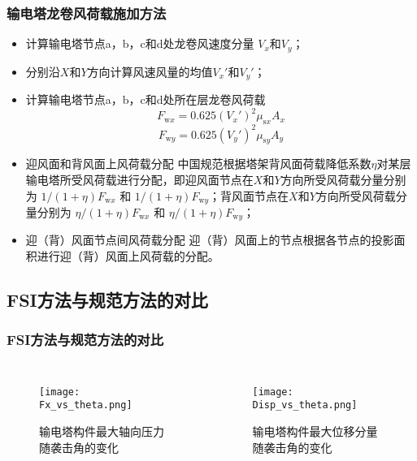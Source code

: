 \begin{frame}
  \frametitle{输电塔龙卷风荷载施加方法}
  \begin{itemize}
  \item 计算输电塔节点a，b，c和d处龙卷风速度分量 $V_x$和$V_y$；
  \item 分别沿$X$和$Y$方向计算风速风量的均值$V_x'$和$V_y'$；
  \item 计算输电塔节点a，b，c和d处所在层龙卷风荷载
    \begin{equation}
      F_{\mathrm{w}x} = 0.625 (V_{x}')^2 \mu_{\mathrm{s}x} A_x 
    \end{equation}
    \begin{equation}
      F_{\mathrm{w}y} = 0.625 (V_{y}')^2 \mu_{\mathrm{s}y} A_y 
    \end{equation}
  \item 迎风面和背风面上风荷载分配
     中国规范根据塔架背风面荷载降低系数$\eta$对某层输电塔所受风荷载进行分配，即迎风面节点在$X$和$Y$方向所受风荷载分量分别为 $1/(1+\eta) F_{\mathrm{w}x}$ 和 $1/(1+\eta) F_{\mathrm{w}y}$；背风面节点在$X$和$Y$方向所受风荷载分量分别为 $\eta/(1+\eta) F_{\mathrm{w}x}$ 和 $\eta/(1+\eta) F_{\mathrm{w}y}$；
   \item 迎（背）风面节点间风荷载分配
     迎（背）风面上的节点根据各节点的投影面积进行迎（背）风面上风荷载的分配。
   \end{itemize}
\end{frame}

\subsection{FSI方法与规范方法的对比}

\begin{frame}
  \frametitle{FSI方法与规范方法的对比}
  
  \begin{columns}
    \begin{figure}[!htbp]
      \centering
      \texttt{[image: Fx\_vs\_theta.png]}
      \caption*{输电塔构件最大轴向压力随袭击角的变化}
      \label{fig:fx-vs-theta}
    \end{figure}

    \begin{figure}[!htbp]
      \centering
      \texttt{[image: Disp\_vs\_theta.png]}
      \caption*{输电塔构件最大位移分量随袭击角的变化}
      \label{fig:disp-vs-theta}
    \end{figure}

  \end{columns}
\end{frame}


